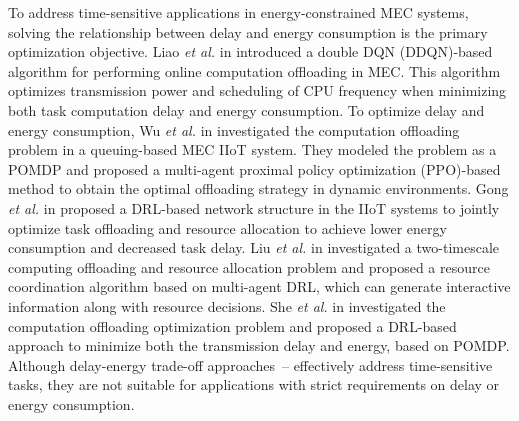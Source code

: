 \documentclass[12pt,draftclsnofoot,onecolumn]{IEEEtran}
\begin{document}
	To address time-sensitive applications in energy-constrained MEC systems, solving the relationship between delay and energy consumption is the primary optimization objective.
	Liao \textit{et al.} in \cite{liao2023online} introduced a double DQN (DDQN)-based algorithm for performing online computation offloading in MEC. This algorithm optimizes transmission power and scheduling of CPU frequency when minimizing both task computation delay and energy consumption. 
	To optimize delay and energy consumption, Wu \textit{et al.} in \cite{wu2023multi} investigated the computation offloading problem in a queuing-based MEC IIoT system. They modeled the problem as a POMDP and proposed a multi-agent proximal policy optimization (PPO)-based method to obtain the optimal offloading strategy in dynamic environments. 
	Gong \textit{et al.} in \cite{gong2022edge} proposed a DRL-based network structure in the IIoT systems to jointly optimize task offloading and resource allocation to achieve lower energy consumption and decreased task delay.
	Liu \textit{et al.} in \cite{liu2021learn} investigated a two-timescale computing offloading and resource allocation problem and proposed a resource coordination algorithm based on multi-agent DRL, which can generate interactive information along with resource decisions. 
	She \textit{et al.} in \cite{she2024efficient} investigated the computation offloading optimization problem and proposed a DRL-based approach to minimize both the transmission delay and energy, based on POMDP.
	Although delay-energy trade-off approaches~\cite{liao2023online}--\cite{she2024efficient} effectively address time-sensitive tasks, they are not suitable for applications with strict requirements on delay or energy consumption. 
	
\end{document}
